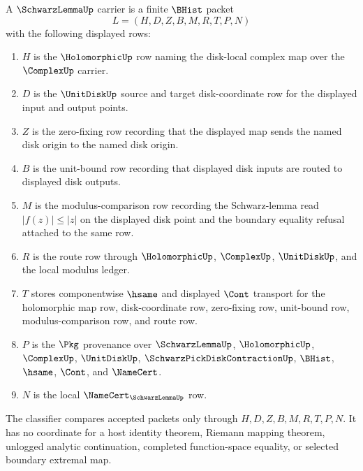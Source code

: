 \begin{definition}
\label{def:schwarz-lemma-carrier}
A $\SchwarzLemmaUp$ carrier is a finite $\BHist$ packet
$$
L=(H,D,Z,B,M,R,T,P,N)
$$
with the following displayed rows:
\begin{enumerate}
\item $H$ is the $\HolomorphicUp$ row naming the disk-local complex map over the $\ComplexUp$ carrier.
\item $D$ is the $\UnitDiskUp$ source and target disk-coordinate row for the displayed input and output points.
\item $Z$ is the zero-fixing row recording that the displayed map sends the named disk origin to the named disk origin.
\item $B$ is the unit-bound row recording that displayed disk inputs are routed to displayed disk outputs.
\item $M$ is the modulus-comparison row recording the Schwarz-lemma read $|f(z)|\leq |z|$ on the displayed disk point and the boundary equality refusal attached to the same row.
\item $R$ is the route row through $\HolomorphicUp$, $\ComplexUp$, $\UnitDiskUp$, and the local modulus ledger.
\item $T$ stores componentwise $\hsame$ and displayed $\Cont$ transport for the holomorphic map row, disk-coordinate row, zero-fixing row, unit-bound row, modulus-comparison row, and route row.
\item $P$ is the $\Pkg$ provenance over $\SchwarzLemmaUp$, $\HolomorphicUp$, $\ComplexUp$, $\UnitDiskUp$, $\SchwarzPickDiskContractionUp$, $\BHist$, $\hsame$, $\Cont$, and $\NameCert$.
\item $N$ is the local $\NameCert_{\SchwarzLemmaUp}$ row.
\end{enumerate}
The classifier compares accepted packets only through $H,D,Z,B,M,R,T,P,N$. It has no coordinate for a host identity theorem, Riemann mapping theorem, unlogged analytic continuation, completed function-space equality, or selected boundary extremal map.
\end{definition}

